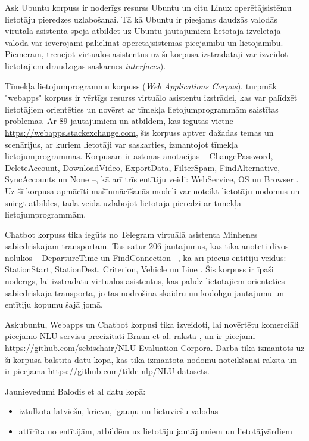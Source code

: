 Ask Ubuntu korpuss ir noderīgs resurss Ubuntu un citu Linux operētājsistēmu lietotāju pieredzes uzlabošanai. Tā kā Ubuntu ir pieejams daudzās valodās virutālā asistenta spēja atbildēt uz Ubuntu jautājumiem lietotāja izvēlētajā valodā var ievērojami palielināt operētājsistēmas pieejamību un lietojamību. Piemēram, trenējot virtuālos asistentus uz šī korpusa izstrādātāji var izveidot lietotājiem draudzīgas saskarnes \textit{interfaces}). 


Tīmekļa lietojumprogrammu korpuss (\textit{Web Applications Corpus}), turpmāk "webapps" korpuss ir vērtīgs resurss virtuālo asistentu izstrādei, kas var palīdzēt lietotājiem orientēties un novērst ar tīmekļa lietojumprogrammām saistītas problēmas. Ar 89 jautājumiem un atbildēm, kas iegūtas vietnē \url{https://webapps.stackexchange.com}, šis korpuss aptver dažādas tēmas un scenārijus, ar kuriem lietotāji var saskarties, izmantojot tīmekļa lietojumprogrammas. Korpusam ir astoņas anotācijas -- ChangePassword, DeleteAccount, DownloadVideo, ExportData, FilterSpam, FindAlternative, SyncAccounts un None --, kā arī trīs entītiju veidi: WebService, OS un Browser \cite{braun-2017}. Uz šī korpusa apmācīti mašīnmācīšanās modeļi var noteikt lietotāju nodomus un sniegt atbildes, tādā veidā uzlabojot lietotāja pieredzi ar tīmekļa lietojumprogrammām.

Chatbot korpuss tika iegūts no Telegram virtuālā asistenta Minhenes sabiedriskajam transportam. Tas satur 206 jautājumus, kas tika anotēti divos nolūkos -- DepartureTime un FindConnection --, kā arī piecus entītiju veidus: StationStart, StationDest, Criterion, Vehicle un Line \cite{braun-2017}. Šis korpuss ir īpaši noderīgs, lai izstrādātu virtuālos asistentus, kas palīdz lietotājiem orientēties sabiedriskajā transportā, jo tas nodrošina skaidru un kodolīgu jautājumu un entītiju kopumu šajā jomā. 

Askubuntu, Webapps un Chatbot korpusi tika izveidoti, lai novērtētu komerciāli pieejamo NLU servisu precizitāti Braun et al. rakstā \cite{braun-2017}, un ir pieejami \url{https://github.com/sebischair/NLU-Evaluation-Corpora}. Darbā tika izmantots uz šī korpusa balstīta datu kopa, kas tika izmantota nodomu noteikšanai \cite{fasttext2019} rakstā un ir pieejama \url{https://github.com/tilde-nlp/NLU-datasets}.

Jaunievedumi Balodis et al datu kopā:
\begin{itemize}
    \item iztulkota latviešu, krievu, igauņu un lietuviešu valodās
    \item attīrīta no entītijām, atbildēm uz lietotāju jautājumiem un lietotājvārdiem
\end{itemize}